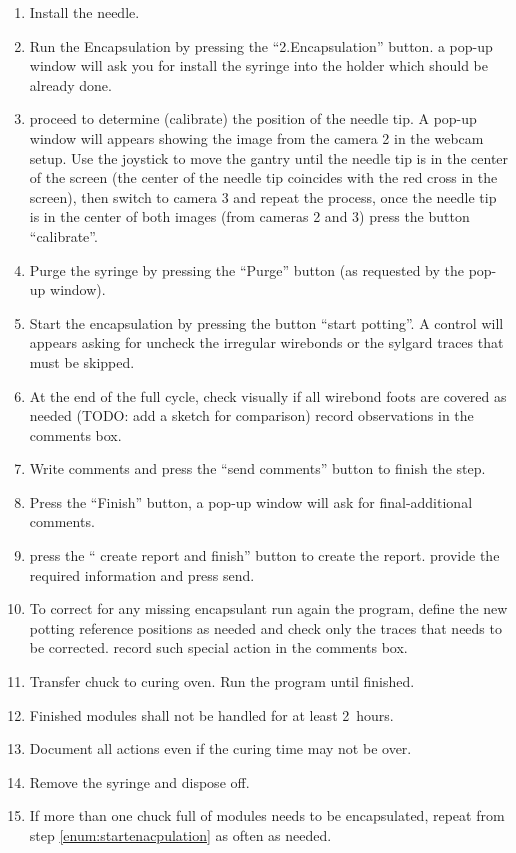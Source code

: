\documentclass[12pt]{unlsilabsop}
\begin{document}
\begin{enumerate}
    \item Install the needle.
    \item Run the Encapsulation by pressing the ``2.Encapsulation'' button. a pop-up window will ask you for install the syringe into the holder which should be already done.
    \item proceed to determine (calibrate) the position of the needle tip. A pop-up window will appears showing the image from the camera 2 in the webcam setup. Use the joystick to move the gantry until the needle tip is in the center of the screen (the center of the needle tip coincides with the red cross in the screen), then switch to camera 3 and repeat the process, once the needle tip is in the center of both images (from cameras 2 and 3) press the button ``calibrate''.
    \item Purge the syringe by pressing the ``Purge'' button (as requested by the pop-up window).
    \item Start the encapsulation by pressing the button ``start potting''. A control will appears asking for uncheck the irregular wirebonds or the sylgard traces that must be skipped.     
    \item At the end of the full cycle, check visually if all wirebond foots are covered as needed (TODO: add a sketch for comparison) record observations in the comments box.
    \item Write comments and press the ``send comments'' button to finish the step. 
    \item Press the ``Finish'' button, a pop-up window will ask for final-additional comments.
    \item press the `` create report and finish'' button to create the report. provide the required information and press send.
      \item To correct for any missing encapsulant run again the program, define the new potting reference positions as needed and check only the traces that needs to be corrected. record such special action in the comments box.
    \item Transfer chuck to curing oven. Run the program until finished.
    \item Finished modules shall not be handled for at least 2~hours.
    \item Document all actions even if the curing time may not be over.
    \item Remove the syringe and dispose off.   
    \item If more than one chuck full of modules needs to be encapsulated, repeat from step \ref{enum:startenacpulation} as often as needed.
\end{enumerate}
\end{document}
